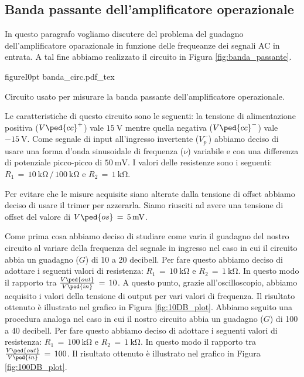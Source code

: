 \subsection*{Banda passante dell'amplificatore operazionale}

In questo paragrafo vogliamo discutere del problema del guadagno dell'amplificatore oparazionale in funzione delle frequeanze dei segnali AC in entrata. A tal fine abbiamo realizzato il circuito in Figura \ref{fig:banda_passante}.


\begin{wrapfloat}{figure}{I}{0pt}
	\def\svgwidth{0.48\textwidth}
    {banda_circ.pdf_tex}
    \caption{Circuito usato per misurare la banda passante dell'amplificatore operazionale.}
    \label{fig:banda_passante}
\end{wrapfloat}

Le caratteristiche di questo circuito sono le seguenti: la tensione di alimentazione positiva ($V\ped{cc}^+$) vale $\SI{+15}{\volt}$ mentre quella negativa ($V\ped{cc}^-$) vale $\SI{-15}{\volt}$. Come segnale di input all'ingresso invertente ($V_p^-$) abbiamo deciso di usare una forma d'onda sinusoidale di frequenza ($\nu$) variabile e con una differenza di potenziale picco-picco di $\SI{50}{\milli\volt}$. I valori delle resistenze sono i seguenti: $R_1\,=\,\SI{10}{\kilo\ohm}\,/\,\SI{100}{\kilo\ohm}$ e $R_2\,=\,\SI{1}{\kilo\ohm}$.

Per evitare che le misure acquisite siano alterate dalla tensione di offset abbiamo deciso di usare il trimer per azzerarla. Siamo riusciti ad avere una tensione di offset del valore di $V\ped{os}\,=\,\SI{5}{\milli\volt}$.

Come prima cosa abbiamo deciso di studiare come varia il guadagno del nostro circuito al variare della frequenza del segnale in ingresso nel caso in cui il circuito abbia un guadagno ($G$) di 10 a 20 decibell. Per fare questo abbiamo deciso di adottare i seguenti valori di resistenza: $R_1\,=\,\SI{10}{\kilo\ohm}$ e $R_2\,=\,\SI{1}{\kilo\ohm}$. In questo modo il rapporto tra $\frac{V\ped{out}}{V\ped{in}}\,=\,10$. A questo punto, grazie all'oscilloscopio, abbiamo acquisito i valori della tensione di output per vari valori di frequenza. Il risultato ottenuto è illustrato nel grafico in Figura \ref{fig:10DB_plot}.
Abbiamo seguito una procedura analoga nel caso in cui il nostro circuito abbia un guadagno ($G$) di 100 a 40 decibell. Per fare questo abbiamo deciso di adottare i seguenti valori di resistenza: $R_1\,=\,\SI{100}{\kilo\ohm}$ e $R_2\,=\,\SI{1}{\kilo\ohm}$. In questo modo il rapporto tra $\frac{V\ped{out}}{V\ped{in}}\,=\,100$. Il risultato ottenuto è illustrato nel grafico in Figura \ref{fig:100DB_plot}.

